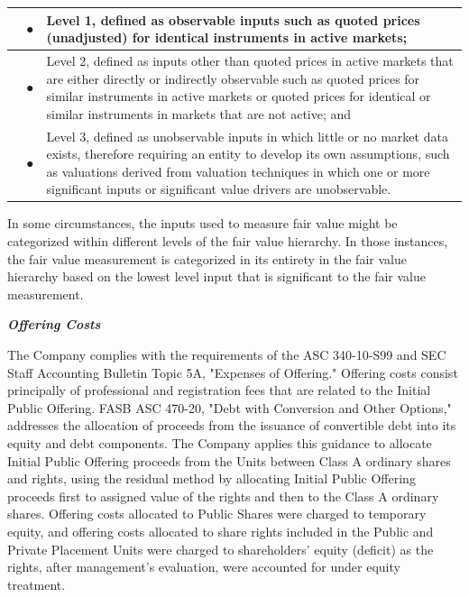 \documentclass[11pt,a4paper]{article}
\begin{document}
\begin{table}[h]
\begin{tabular}{|l|l|l|}
\hline
 & ● & Level 1, defined as observable inputs such as quoted prices (unadjusted) for identical instruments in active markets; \\ \hline
 & ● & Level 2, defined as inputs other than quoted prices in active markets that are either directly or indirectly observable such as quoted prices for similar instruments in active markets or quoted prices for identical or similar instruments in markets that are not active; and \\ \hline
 & ● & Level 3, defined as unobservable inputs in which little or no market data exists, therefore requiring an entity to develop its own assumptions, such as valuations derived from valuation techniques in which one or more significant inputs or significant value drivers are unobservable. \\ \hline
\end{tabular}
\end{table}

In some circumstances, the inputs used to measure fair value might be categorized within different levels of the fair value hierarchy. In those instances, the fair value measurement is categorized in its entirety in the fair value hierarchy based on the lowest level input that is significant to the fair value measurement.

\textit{\textbf{Offering Costs}}

The Company complies with the requirements of the ASC 340-10-S99 and SEC Staff Accounting Bulletin Topic 5A, "Expenses of Offering." Offering costs consist principally of professional and registration fees that are related to the Initial Public Offering. FASB ASC 470-20, "Debt with Conversion and Other Options," addresses the allocation of proceeds from the issuance of convertible debt into its equity and debt components. The Company applies this guidance to allocate Initial Public Offering proceeds from the Units between Class A ordinary shares and rights, using the residual method by allocating Initial Public Offering proceeds first to assigned value of the rights and then to the Class A ordinary shares. Offering costs allocated to Public Shares were charged to temporary equity, and offering costs allocated to share rights included in the Public and Private Placement Units were charged to shareholders' equity (deficit) as the rights, after management's evaluation, were accounted for under equity treatment.
\end{document}
